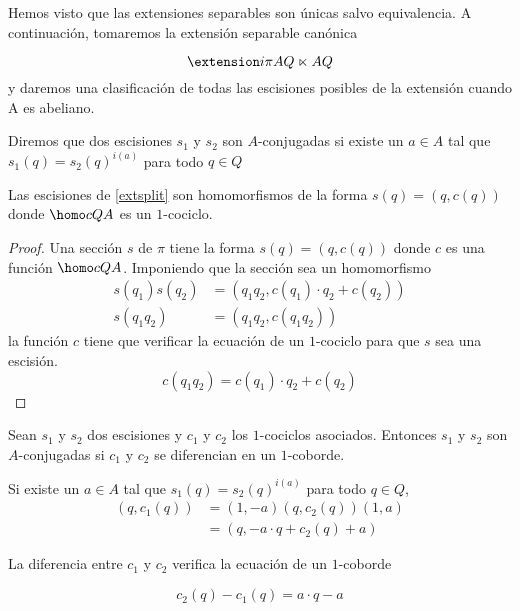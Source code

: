 Hemos visto que las extensiones separables son únicas salvo equivalencia. A continuación, tomaremos la extensión separable canónica

\begin{equation}\label{extsplit}
	\extension i \pi A {Q \ltimes A} Q
\end{equation}
y daremos una clasificación de todas las escisiones posibles de la extensión cuando A es abeliano.

\begin{definicion}
	Diremos que dos escisiones $s_1$ y $s_2$ son $A$-conjugadas si existe un $a\in A$ tal que $s_1(q)=s_2(q)^{i(a)}$ para todo $q\in Q$
\end{definicion}

\begin{proposicion}
	Las escisiones de \eqref{extsplit} son homomorfismos de la forma $s(q) = (q,c(q))$ donde $\homo c Q A$ es un $1$-cociclo.
	\begin{proof}
		Una sección $s$ de $\pi$ tiene la forma $s(q) = (q,c(q))$ donde $c$ es una función $\homo c Q A$. Imponiendo que la sección sea un homomorfismo
		\begin{align*}
			s(q_1)s(q_2) &= (q_1q_2,c(q_1)\cdot q_2 + c(q_2)) \\
			s(q_1q_2) &= (q_1q_2,c(q_1q_2))
		\end{align*}
		la función $c$ tiene que verificar la ecuación de un $1$-cociclo para que $s$ sea una escisión.
		\begin{equation}
			c(q_1q_2) = c(q_1)\cdot q_2 + c(q_2)
		\end{equation}
	\end{proof}
\end{proposicion}



\begin{proposicion}
	Sean $s_1$ y $s_2$ dos escisiones y $c_1$ y $c_2$ los $1$-cociclos asociados. Entonces $s_1$ y $s_2$ son $A$-conjugadas si $c_1$ y $c_2$ se diferencian en un $1$-coborde.
	\begin{demostracion}
		Si existe un $a \in A$ tal que $s_1(q) = s_2(q)^{i(a)}$ para todo $q\in Q$, 
		\begin{align*}
		(q,c_1(q)) &= (1,-a)(q,c_2(q))(1,a) \\
					&= (q,-a \cdot q +  c_2(q) + a)
		\end{align*}
		
		La diferencia entre $c_1$ y $c_2$ verifica la ecuación de un $1$-coborde
		
		\begin{equation}
			c_2(q) - c_1(q) = a\cdot q - a
		\end{equation}
	\end{demostracion}
\end{proposicion}

